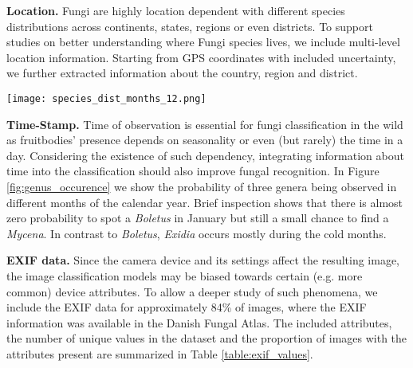\documentclass[10pt,twocolumn,letterpaper]{article}
\begin{document}
\textbf{Location.} Fungi are highly location dependent with different species distributions across continents, states, regions or even districts. To support studies on better understanding where Fungi species lives, we include multi-level location information. Starting from GPS coordinates with included uncertainty, we further extracted information about the country, region and district. 


\begin{figure*}[t!]
\begin{center}
\texttt{[image: species\_dist\_months\_12.png]}
\caption{Monthly distribution of observations in the DF20 dataset for genera Mycena, Boletus, and Agaricus. The differences imply that the class prior distribution varies significantly over time.}
\label{fig:genus_occurence}
\end{center}
\end{figure*}

\textbf{Time-Stamp.} Time of observation is essential for fungi classification in the wild as fruitbodies' presence depends on  seasonality or even (but rarely) the time in a day. Considering the existence of such dependency, integrating information about time into the classification should also improve fungal recognition. In Figure\,\ref{fig:genus_occurence} we show the probability of three genera being observed in different months of the calendar year. Brief inspection shows that there is almost zero probability to spot a \textit{Boletus} in January but still a small chance to find a \textit{Mycena}. In contrast to \textit{Boletus}, \textit{Exidia} occurs mostly during the cold months.


\textbf{EXIF data.} Since the camera device and its settings affect the resulting image, the image classification models may be biased towards certain (e.g. more common) device attributes. To allow a deeper study of such phenomena, we include the EXIF data for approximately 84\% of images, where the EXIF information was available in the Danish Fungal Atlas. The included attributes, the number of unique values in the dataset and the proportion of images with the attributes present are summarized in Table \ref{table:exif_values}.
\end{document}
